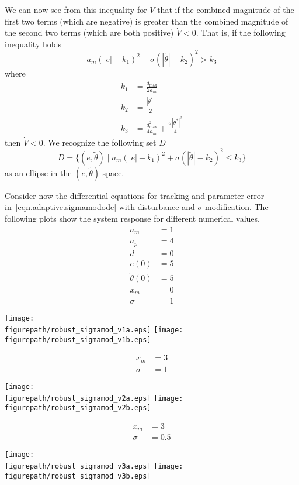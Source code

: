 We can now see from this inequality for $\dot{V}$ that if the combined magnitude of the first two terms (which are negative) is greater than the combined magnitude of the second two terms (which are both positive) $\dot{V}<0$.
That is, if the following inequality holds
\begin{equation*}
  a_{m}(|e|-k_{1})^{2}+\sigma(|\tilde{\theta}|-k_{2})^{2}>k_{3}
\end{equation*}
where
\begin{align*}
  k_{1}&=\frac{d_{\text{max}}}{2a_{m}} \\
  k_{2}&=\frac{|\theta^{*}|}{2} \\
  k_{3}&=\frac{d_{\text{max}}^{2}}{4a_{m}}+\frac{\sigma|\theta^{*}|^{2}}{4}
\end{align*}
then $\dot{V}<0$.
We recognize the following set $D$
\begin{equation*}
  D=\{(e,\tilde{\theta})\;\bigr|\;a_{m}(|e|-k_{1})^{2}+\sigma(|\tilde{\theta}|-k_{2})^{2}\leq k_{3}\}
\end{equation*}
as an ellipse in the $(e,\tilde{\theta})$ space.

\begin{example}
  Consider now the differential equations for tracking and parameter error in~\eqref{eqn.adaptive.sigmamodode} with disturbance and $\sigma$-modification.
  The following plots show the system response for different numerical values.
  \begin{align*}
    a_{m}&=1 \\
    a_{p}&=4 \\
    d&=0 \\
    e(0)&=5 \\
    \tilde{\theta}(0)&=5 \\
    x_{m}&=0 \\
    \sigma&=1
  \end{align*}
  \begin{center}
    \texttt{[image: \\figurepath/robust\_sigmamod\_v1a.eps]}
    \texttt{[image: \\figurepath/robust\_sigmamod\_v1b.eps]}
  \end{center}
  \begin{align*}
  x_{m}&=3 \\
  \sigma&=1
  \end{align*}
  \begin{center}
    \texttt{[image: \\figurepath/robust\_sigmamod\_v2a.eps]}
    \texttt{[image: \\figurepath/robust\_sigmamod\_v2b.eps]}
  \end{center}
  \begin{align*}
  x_{m}&=3 \\
  \sigma&=0.5
  \end{align*}
  \begin{center}
    \texttt{[image: \\figurepath/robust\_sigmamod\_v3a.eps]}
    \texttt{[image: \\figurepath/robust\_sigmamod\_v3b.eps]}
  \end{center}
\end{example}

